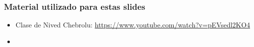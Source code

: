 \begin{frame}
    \frametitle{Material utilizado para estas slides}
    
    \begin{itemize}
        \item Clase de Nived Chebrolu: \url{https://www.youtube.com/watch?v=pEVsedl2KO4}
        \item 
    \end{itemize}

    
\end{frame}


